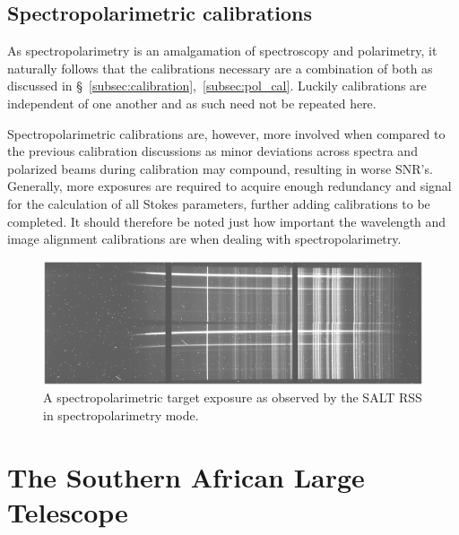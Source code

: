 
\subsection{Spectropolarimetric calibrations}

As spectropolarimetry is an amalgamation of spectroscopy and polarimetry, it naturally follows that the calibrations necessary are a combination of both as discussed in \S~\ref{subsec:calibration},~\ref{subsec:pol_cal}. Luckily calibrations are independent of one another and as such need not be repeated here.
\prgph

Spectropolarimetric calibrations are, however, more involved when compared to the previous calibration discussions as minor deviations across spectra and polarized beams during calibration may compound, resulting in worse \gls{SNR}'s. Generally, more exposures are required to acquire enough redundancy and signal for the calculation of all Stokes parameters, further adding calibrations to be completed. It should therefore be noted just how important the wavelength and image alignment calibrations are when dealing with spectropolarimetry.

\begin{figure}[t]
    \centering
    \includegraphics[width=1.0\textwidth]{figures/2_specpol_sci.pdf}
    \caption{A spectropolarimetric target exposure as observed by the \gls{SALT} \gls{RSS} in spectropolarimetry mode.}
    \label{fig:specpol_exposure}
\end{figure}


\section{The Southern African Large Telescope} \label{sec:SALT} %

